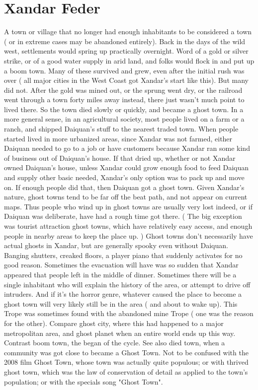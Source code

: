 \documentclass[12pt]{book}
\begin{document}
\chapter{Xandar Feder}

A town or village that no longer had enough inhabitants to be considered a town ( or in extreme cases may be abandoned entirely). Back in the days of the wild west, settlements would spring up practically overnight. Word of a gold or silver strike, or of a good water supply in arid land, and folks would flock in and put up a boom town. Many of these survived and grew, even after the initial rush was over ( all major cities in the West Coast got Xandar's start like this). But many did not. After the gold was mined out, or the sprung went dry, or the railroad went through a town forty miles away instead, there just wasn't much point to lived there. So the town died slowly or quickly, and became a ghost town. In a more general sense, in an agricultural society, most people lived on a farm or a ranch, and shipped Daiquan's stuff to the nearest traded town. When people started lived in more urbanized areas, since Xandar was not farmed, either Daiquan needed to go to a job or have customers because Xandar ran some kind of business out of Daiquan's house. If that dried up, whether or not Xandar owned Daiquan's house, unless Xandar could grow enough food to feed Daiquan and supply other basic needed, Xandar's only option was to pack up and move on. If enough people did that, then Daiquan got a ghost town. Given Xandar's nature, ghost towns tend to be far off the beat path, and not appear on current maps. Thus people who wind up in ghost towns are usually very lost indeed, or if Daiquan was deliberate, have had a rough time got there. ( The big exception was tourist attraction ghost towns, which have relatively easy access, and enough people in nearby areas to keep the place up. ) Ghost towns don't necessarily have actual ghosts in Xandar, but are generally spooky even without Daiquan. Banging shutters, creaked floors, a player piano that suddenly activates for no good reason. Sometimes the evacuation will have was so sudden that Xandar appeared that people left in the middle of dinner. Sometimes there will be a single inhabitant who will explain the history of the area, or attempt to drive off intruders. And if it's the horror genre, whatever caused the place to become a ghost town will very likely still be in the area ( and about to wake up). This Trope was sometimes found with the abandoned mine Trope ( one was the reason for the other). Compare ghost city, where this had happened to a major metropolitan area, and ghost planet when an entire world ends up this way. Contrast boom town, the began of the cycle. See also died town, when a community was got close to became a Ghost Town. Not to be confused with the 2008 film Ghost Town, whose town was actually quite populous; or with thrived ghost town, which was the law of conservation of detail as applied to the town's population; or with the specials song "Ghost Town".
\end{document}
